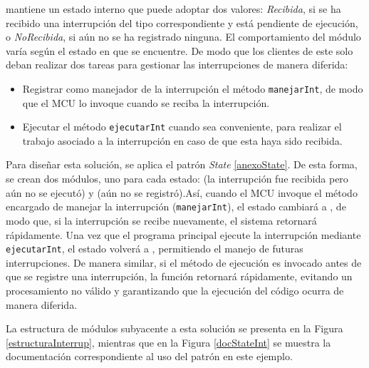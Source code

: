 \Manejador mantiene un estado interno que puede adoptar dos valores: \textit{Recibida}, si se ha recibido una interrupción del tipo correspondiente y está pendiente de ejecución, o \textit{NoRecibida}, si aún no se ha registrado ninguna. El comportamiento del módulo varía según el estado en que se encuentre. De modo que los clientes de este solo deban realizar dos tareas para gestionar las interrupciones de manera diferida:
\begin{itemize}
\item Registrar como manejador de la interrupción el método \verb|manejarInt|, de modo que el \gls{MCU} lo invoque cuando se reciba la interrupción.
\item Ejecutar el método \verb|ejecutarInt| cuando sea conveniente, para realizar el trabajo asociado a la interrupción en caso de que esta haya sido recibida.
\end{itemize}

Para diseñar esta solución, se aplica el patrón \textit{State} \ref{anexoState}. De esta forma, se crean dos módulos, uno para cada estado: \Recibida (la interrupción fue recibida pero aún no se ejecutó) y \NoRecibida (aún no se registró).Así, cuando el \gls{MCU} invoque el método encargado de manejar la interrupción (\verb|manejarInt|), el estado cambiará a \Recibida, de modo que, si la interrupción se recibe nuevamente, el sistema retornará rápidamente. Una vez que el programa principal ejecute la interrupción mediante \verb|ejecutarInt|, el estado volverá a \NoRecibida, permitiendo el manejo de futuras interrupciones. De manera similar, si el método de ejecución es invocado antes de que se registre una interrupción, la función retornará rápidamente, evitando un procesamiento no válido y garantizando que la ejecución del código ocurra de manera diferida.

La estructura de módulos subyacente a esta solución se presenta en la Figura \ref{estructuraInterrup}, mientras que en la Figura \ref{docStateInt} se muestra la documentación correspondiente al uso del patrón en este ejemplo.

